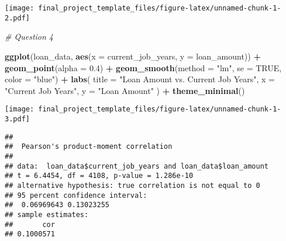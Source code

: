\documentclass[
]{article}
\newenvironment{Shaded}{\begin{snugshade}}{\end{snugshade}}
\newcommand{\AttributeTok}[1]{\textcolor[rgb]{0.13,0.29,0.53}{#1}}
\newcommand{\CommentTok}[1]{\textcolor[rgb]{0.56,0.35,0.01}{\textit{#1}}}
\newcommand{\ConstantTok}[1]{\textcolor[rgb]{0.56,0.35,0.01}{#1}}
\newcommand{\FloatTok}[1]{\textcolor[rgb]{0.00,0.00,0.81}{#1}}
\newcommand{\FunctionTok}[1]{\textcolor[rgb]{0.13,0.29,0.53}{\textbf{#1}}}
\newcommand{\NormalTok}[1]{#1}
\newcommand{\SpecialCharTok}[1]{\textcolor[rgb]{0.81,0.36,0.00}{\textbf{#1}}}
\newcommand{\StringTok}[1]{\textcolor[rgb]{0.31,0.60,0.02}{#1}}
\begin{document}
\texttt{[image: final\_project\_template\_files/figure-latex/unnamed-chunk-1-2.pdf]}

\begin{Shaded}
\begin{Highlighting}[]
\CommentTok{\# Question 4}

\FunctionTok{ggplot}\NormalTok{(loan\_data, }\FunctionTok{aes}\NormalTok{(}\AttributeTok{x =}\NormalTok{ current\_job\_years, }\AttributeTok{y =}\NormalTok{ loan\_amount)) }\SpecialCharTok{+}
  \FunctionTok{geom\_point}\NormalTok{(}\AttributeTok{alpha =} \FloatTok{0.4}\NormalTok{) }\SpecialCharTok{+}
  \FunctionTok{geom\_smooth}\NormalTok{(}\AttributeTok{method =} \StringTok{"lm"}\NormalTok{, }\AttributeTok{se =} \ConstantTok{TRUE}\NormalTok{, }\AttributeTok{color =} \StringTok{"blue"}\NormalTok{) }\SpecialCharTok{+}
  \FunctionTok{labs}\NormalTok{(}
    \AttributeTok{title =} \StringTok{"Loan Amount vs. Current Job Years"}\NormalTok{,}
    \AttributeTok{x =} \StringTok{"Current Job Years"}\NormalTok{,}
    \AttributeTok{y =} \StringTok{"Loan Amount"}
\NormalTok{  ) }\SpecialCharTok{+}
  \FunctionTok{theme\_minimal}\NormalTok{()}
\end{Highlighting}
\end{Shaded}

\texttt{[image: final\_project\_template\_files/figure-latex/unnamed-chunk-1-3.pdf]}

\begin{Shaded}
\end{Shaded}

\begin{verbatim}
## 
##  Pearson's product-moment correlation
## 
## data:  loan_data$current_job_years and loan_data$loan_amount
## t = 6.4454, df = 4108, p-value = 1.286e-10
## alternative hypothesis: true correlation is not equal to 0
## 95 percent confidence interval:
##  0.06969643 0.13023255
## sample estimates:
##       cor 
## 0.1000571
\end{verbatim}
\end{document}
